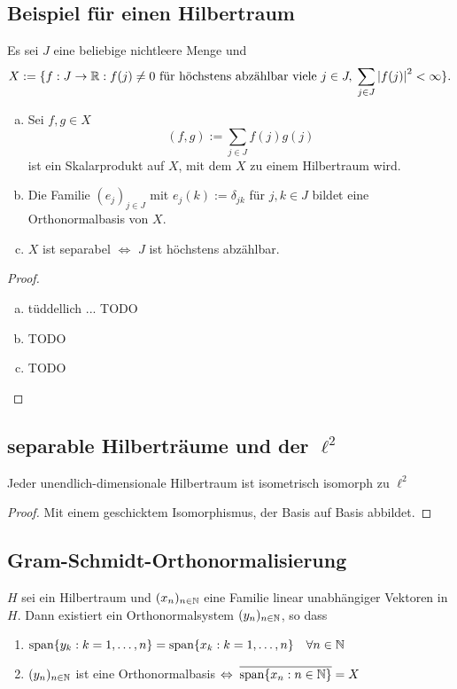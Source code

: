\documentclass[FunkAnaskriptSS2017.tex]{subfiles}
\begin{document}
\subsection{ Beispiel für einen Hilbertraum}
\label{B5.1}
Es sei $J$ eine beliebige nichtleere Menge und
	$$X:=\{ f: J \to \mathbb{R} : f(j) \not = 0 \text{ für höchstens abzählbar viele } j\in J,\; \sum_{j\in J} \left\lvert f(j) \right\rvert ^2 < \infty\}.$$
	\begin{enumerate}[(a)]
	\item Sei $f,g \in X$
		$$(f,g) := \sum_{j\in J} f(j)g(j) $$
		ist ein Skalarprodukt auf $X$, mit dem $X$ zu einem Hilbertraum wird.
	
	\item Die Familie $(e_j)_{j\in J}$ mit $e_j(k) := \delta_{jk} $ für $j,k\in J$ bildet eine Orthonormalbasis von $X$.
	
	\item $X$ ist separabel $\Leftrightarrow$ $J$ ist höchstens abzählbar.	
	\end{enumerate}
	
	\begin{proof}
	\begin{enumerate}[(a)]
		\item tüddellich ... TODO
		\item TODO
		\item TODO
	\end{enumerate}		
	
	\end{proof}
	
\subsection{ separable Hilberträume und der $\ell ^2$}
\label{B5.2}
	Jeder unendlich-dimensionale Hilbertraum ist isometrisch isomorph zu $\ell^2$
	\begin{proof}
		Mit einem geschicktem Isomorphismus, der Basis auf Basis abbildet.
	\end{proof}
	
\subsection{ Gram-Schmidt-Orthonormalisierung}
\label{B5.3}
	$H$ sei ein Hilbertraum und $(x_n)_{n\in \mathbb{N}}$ eine Familie linear unabhängiger Vektoren in $H$. Dann existiert ein Orthonormalsystem $(y_n)_{n\in \mathbb{N}}$, so dass
	\begin{enumerate}
		\item $\textnormal{span} \{ y_k : k = 1, \dots, n \} = \textnormal{span} \{ x_k : k = 1,\dots , n\} \quad \forall n\in \mathbb{N}$
		\item $(y_n)_{n\in\mathbb{N}}$ ist eine Orthonormalbasis $\Leftrightarrow \; \overline{\textnormal{span} \{ x_n : n\in\mathbb{N}\} } = X$
	\end{enumerate}
	
\end{document}
